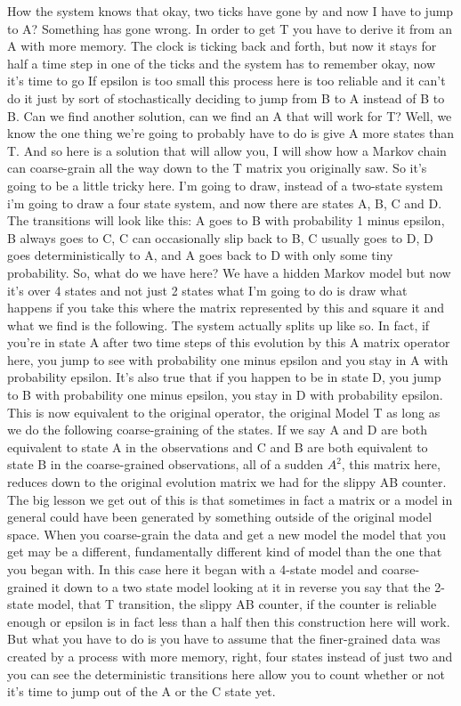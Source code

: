 \documentclass[]{article}
\begin{document}
How the system knows that okay, two ticks have gone
by and now I have to jump to A?
Something has gone wrong.
In order to get T
you have to derive it from an A with more memory.
The clock is ticking back and forth,
but now it stays for half a time step in one
of the ticks and the system has to remember
okay, now it's time to go
If epsilon is too small this process here is too reliable
and it can't do it just by sort of stochastically
deciding to jump from B to A instead of B to B.
Can we find another solution,
can we find an A that will work for T?
Well, we know the one thing we're
going to probably have to do
is give A more states than T.
And so here is a solution that will allow you,
I will show how a Markov chain can coarse-grain
all the way down to the T matrix you originally saw.
So it's going to be a little tricky here.
I'm going to draw, instead of a two-state system
i'm going to draw a four state system,
and now there are states A, B, C and D.
The transitions will look like this:
A goes to B with probability 1 minus epsilon,
B always goes to C,
C can occasionally slip back to B,
C usually goes to D,
D goes deterministically to A,
and A goes back to D
with only some tiny probability.
So, what do we have here?
We have a hidden Markov model
but now it's over 4 states and not just 2 states
what I'm going to do is draw what happens
if you take this where the matrix represented
by this and square it
and what we find is the following.
The system actually splits up
like so. In fact, if you're in state A
after two time steps of this evolution
by this A matrix operator here,
you jump to see with probability one minus epsilon
and you stay in A with probability epsilon.
It's also true that if you happen to be in state D,
you jump to B with probability one minus epsilon,
you stay in D with probability epsilon.
This is now equivalent to the original operator,
the original Model T
as long as we do the following coarse-graining of the states.
If we say A and D are both equivalent to state A
in the observations
and C and B are both equivalent to state B
in the coarse-grained observations,
all of a sudden $A^2$, this matrix here, reduces down to the original
evolution matrix we had
for the slippy AB counter.
The big lesson we get out of this
is that sometimes in fact
a matrix or a model in general
could have been generated by something
outside of the original model space.
When you coarse-grain the data and get a new model
the model that you get may be a different,
fundamentally different kind of model
than the one that you began with.
In this case here it began with a 4-state model
and coarse-grained it down to a two state model
looking at it in reverse
you say that the 2-state model, that T transition,
the slippy AB counter,
if the counter is reliable enough or
epsilon is in fact less than a half
then this construction here will work.
But what you have to do is you have to assume
that the finer-grained data was created
by a process with more memory,
right, four states
instead of just two and you can see
the deterministic transitions here
allow you to count whether or not it's time
to jump out of the A or the C state yet.
\end{document}
